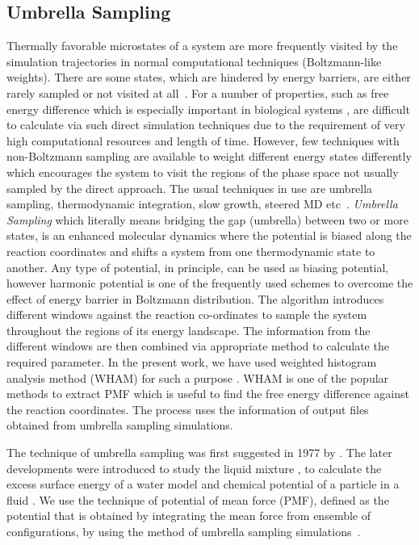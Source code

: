\subsection{Umbrella Sampling}
Thermally favorable microstates of a system are more frequently visited by the simulation trajectories in normal 
computational techniques (Boltzmann-like weights). There are some states, which are hindered by energy barriers, are either rarely sampled or not visited at all~\citep{Allen1989}. For a number of properties, such as free energy difference which is especially important in biological systems \citep{Kastner2011}, are difficult to calculate via such direct simulation techniques due to the requirement of very high computational resources and length of time. However, few techniques with non-Boltzmann sampling are available to weight different energy states differently which encourages the system to visit the regions of the phase space not usually sampled by the direct approach.  The usual techniques in use are umbrella sampling, thermodynamic integration, slow growth, steered MD etc~\citep{Frenkel2002, Kastner2011}. {\it Umbrella Sampling} which literally means bridging the gap (umbrella) between two or more states, is an enhanced molecular dynamics where the potential is biased along the reaction coordinates and shifts a system from one thermodynamic state to another. Any type of potential, in principle, can be used as biasing potential, however harmonic potential is one of the frequently used schemes to overcome the effect of energy barrier in Boltzmann distribution. The algorithm introduces different windows against the reaction co-ordinates to sample the system throughout the regions of its energy landscape. The information from the different windows are then combined via appropriate method to calculate the required parameter. In the present work, we have used weighted histogram analysis method (WHAM) for such a purpose \citep{Kumar1992}. WHAM is one of the popular methods to extract PMF which is useful to find the free energy difference against the reaction coordinates. The process uses the information of output files obtained from umbrella sampling simulations. 
 
 \begin{sloppypar} 
The technique of umbrella sampling was first suggested in 1977 by \citep{Torrie1977a}. The later developments were introduced to study the liquid mixture \citep{Torrie1977b}, to calculate the excess surface energy of a water model \citep{Lee1980} and chemical potential of a particle in a fluid \citep{Shing1981}. We use the technique of potential of mean force (PMF), defined as the potential that is obtained by integrating the mean force from ensemble of configurations, by using the method of umbrella sampling simulations~\citep{Gromacs-manual}. 
 \end{sloppypar}
  
